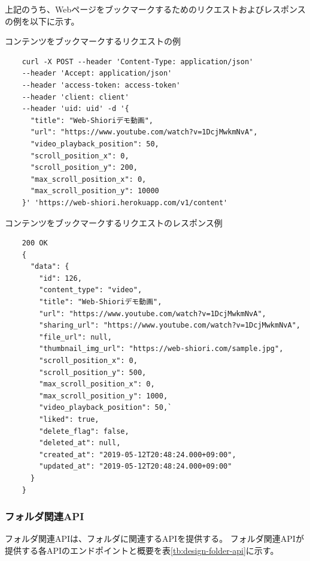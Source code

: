 上記のうち、Webページをブックマークするためのリクエストおよびレスポンスの例を以下に示す。

\begin{itembox}[l]{コンテンツをブックマークするリクエストの例}
  \label{content-request-curl}
  \begin{verbatim}
    curl -X POST --header 'Content-Type: application/json' 
    --header 'Accept: application/json' 
    --header 'access-token: access-token' 
    --header 'client: client' 
    --header 'uid: uid' -d '{
      "title": "Web-Shioriデモ動画",
      "url": "https://www.youtube.com/watch?v=1DcjMwkmNvA",
      "video_playback_position": 50,
      "scroll_position_x": 0,
      "scroll_position_y": 200,
      "max_scroll_position_x": 0,
      "max_scroll_position_y": 10000
    }' 'https://web-shiori.herokuapp.com/v1/content'
  \end{verbatim}
\end{itembox}

\begin{itembox}[l]{コンテンツをブックマークするリクエストのレスポンス例}
  \label{content-response-json}
  \begin{verbatim}
    200 OK
    {
      "data": {
        "id": 126,
        "content_type": "video",
        "title": "Web-Shioriデモ動画",
        "url": "https://www.youtube.com/watch?v=1DcjMwkmNvA",
        "sharing_url": "https://www.youtube.com/watch?v=1DcjMwkmNvA",
        "file_url": null,
        "thumbnail_img_url": "https://web-shiori.com/sample.jpg",
        "scroll_position_x": 0,
        "scroll_position_y": 500,
        "max_scroll_position_x": 0,
        "max_scroll_position_y": 1000,
        "video_playback_position": 50,`
        "liked": true,
        "delete_flag": false,
        "deleted_at": null,
        "created_at": "2019-05-12T20:48:24.000+09:00",
        "updated_at": "2019-05-12T20:48:24.000+09:00"
      }
    }
  \end{verbatim}
\end{itembox}

\subsubsection{フォルダ関連API}
フォルダ関連APIは、フォルダに関連するAPIを提供する。
フォルダ関連APIが提供する各APIのエンドポイントと概要を表\ref{tb:design-folder-api}に示す。

